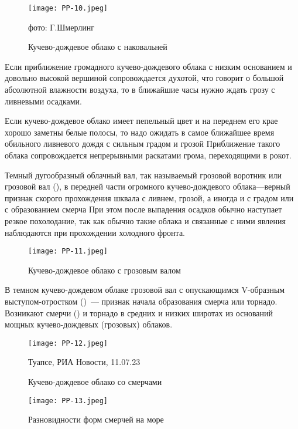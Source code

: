 \begin{figure}[htb]
  \centering{}
  \texttt{[image: PP-10.jpeg]}
  \caption{Кучево-дождевое облако с наковальней}
  \label{fig:pp10}
  \small
  \centering{}фото: Г.Шмерлинг
\end{figure}


 Если приближение громадного кучево-дождевого облака с низким
основанием и довольно высокой вершиной сопровождается духотой, что
говорит о большой абсолютной влажности воздуха, то в ближайшие часы
нужно ждать грозу с ливневыми осадками.

 Если кучево-дождевое облако имеет пепельный цвет и на переднем
его крае хорошо заметны белые полосы, то надо ожидать в самое
ближайшее время обильного ливневого дождя с сильным градом и грозой
Приближение такого облака сопровождается непрерывными раскатами грома,
переходящими в рокот.

 Темный дугообразный облачный вал, так называемый грозовой
воротник или грозовой вал (), в передней части огромного
кучево-дождевого облака—верный признак скорого прохождения шквала с
ливнем, грозой, а иногда и с градом или с образованием смерча При этом
после выпадения осадков обычно наступает резкое похолодание, так как
обычно такие облака и связанные с ними явления наблюдаются при
прохождении холодного фронта.

\begin{figure}[htb]
  \centering{}
  \texttt{[image: PP-11.jpeg]}
  \caption{Кучево-дождевое облако с грозовым валом}
  \label{fig:pp11}
  \small
  \centering{}
\end{figure}

 В темном кучево-дождевом облаке грозовой вал с опускающимся
V-образным выступом-отростком ()~--- признак начала образования
смерча или торнадо. Возникают смерчи () и торнадо в средних и
низких широтах из оснований мощных кучево-дождевых (грозовых) облаков.

\begin{figure}[htb]
  \centering{}
  \texttt{[image: PP-12.jpeg]}
  \caption{Кучево-дождевое облако со смерчами}
  \label{fig:pp12}
  \small
  \centering{}Туапсе, РИА Новости, 11.07.23
\end{figure}

\begin{figure}[htb]
  \centering{}
  \texttt{[image: PP-13.jpeg]}
  \caption{Разновидности форм смерчей на море}
  \label{fig:pp13}
  \small
  \centering{}
\end{figure}

